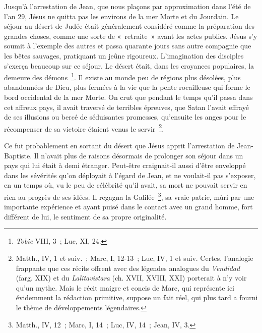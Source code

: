 \documentclass[french,twoside]{book} %
\newcommand\chaptercont{} %
\begin{document}
\chaptercont
\noindent Jusqu’à l’arrestation de Jean, que nous plaçons par approximation dans l’été de l’an 29, Jésus ne quitta pas les environs de la mer Morte et du Jourdain. Le séjour au désert de Judée était généralement considéré comme la préparation des grandes choses, comme une sorte de « retraite » avant les actes publics. Jésus s’y soumit à l’exemple des autres et passa quarante jours sans autre compagnie que les bêtes sauvages, pratiquant un jeûne rigoureux. L’imagination des disciples s’exerça beaucoup sur ce séjour. Le désert était, dans les croyances populaires, la demeure des démons \footnote{{\itshape Tobie} VIII, 3 ; Luc, XI, 24.}. Il existe au monde peu de régions plus désolées, plus abandonnées de Dieu, plus fermées à la vie que la pente rocailleuse qui forme le bord occidental de la mer Morte. On crut que pendant le temps qu’il passa dans cet affreux pays, il avait traversé de terribles épreuves, que Satan l’avait effrayé de ses illusions ou bercé de séduisantes promesses, qu’ensuite les anges pour le récompenser de sa victoire étaient venus le servir \footnote{ Matth., IV, 1 et suiv. ; Marc, I, 12-13 ; Luc, IV, 1 et suiv. Certes, l’analogie frappante que ces récits offrent avec des légendes analogues du {\itshape Vendidad} (farg. XIX) et du {\itshape Lalitavistara} (ch. XVII, XVIII, XXI) porterait à n’y voir qu’un mythe. Mais le récit maigre et concis de Marc, qui représente ici évidemment la rédaction primitive, suppose un fait réel, qui plus tard a fourni le thème de développements légendaires.}.\par
Ce fut probablement en sortant du désert que Jésus apprit l’arrestation de Jean-Baptiste. Il n’avait plus de raisons désormais de prolonger son séjour dans un pays qui lui était à demi étranger. Peut-être craignait-il aussi d’être enveloppé dans les sévérités qu’on déployait à l’égard de Jean, et ne voulait-il pas s’exposer, en un temps où, vu le peu de célébrité qu’il avait, sa mort ne pouvait servir en rien au progrès de ses idées. Il regagna la Galilée \footnote{Matth., IV, 12 ; Marc, I, 14 ; Luc, IV, 14 ; Jean, IV, 3.}, sa vraie patrie, mûri par une importante expérience et ayant puisé dans le contact avec un grand homme, fort différent de lui, le sentiment de sa propre originalité.\par
\end{document}
